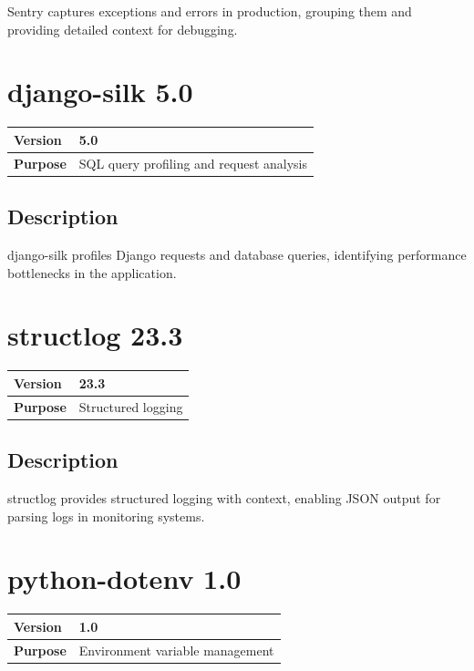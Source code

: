 \documentclass[12pt,a4paper]{report}
\begin{document}
Sentry captures exceptions and errors in production, grouping them and providing detailed context for debugging.

\section{django-silk 5.0}

\begin{tabular}{|p{4cm}|p{10cm}|}
\hline
\textbf{Version} & 5.0 \\
\hline
\textbf{Purpose} & SQL query profiling and request analysis \\
\hline
\end{tabular}

\subsection{Description}

django-silk profiles Django requests and database queries, identifying performance bottlenecks in the application.

\section{structlog 23.3}

\begin{tabular}{|p{4cm}|p{10cm}|}
\hline
\textbf{Version} & 23.3 \\
\hline
\textbf{Purpose} & Structured logging \\
\hline
\end{tabular}

\subsection{Description}

structlog provides structured logging with context, enabling JSON output for parsing logs in monitoring systems.

\section{python-dotenv 1.0}

\begin{tabular}{|p{4cm}|p{10cm}|}
\hline
\textbf{Version} & 1.0 \\
\hline
\textbf{Purpose} & Environment variable management \\
\hline
\end{tabular}
\end{document}
